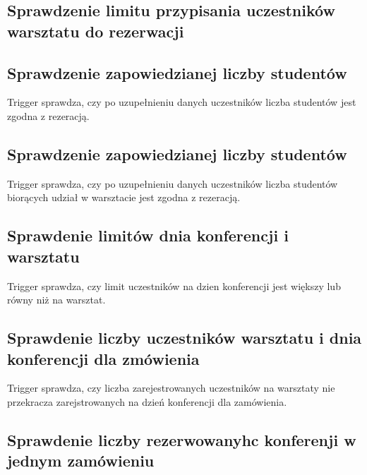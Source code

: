 \documentclass[12pt]{article}
\begin{document}


\subsection{Sprawdzenie limitu przypisania uczestników warsztatu do rezerwacji}



\subsection{Sprawdzenie zapowiedzianej liczby studentów}
Trigger sprawdza, czy po uzupełnieniu danych uczestników liczba studentów jest zgodna z rezeracją.


\subsection{Sprawdzenie zapowiedzianej liczby studentów}
Trigger sprawdza, czy po uzupełnieniu danych uczestników liczba studentów biorących udział w warsztacie jest zgodna z rezeracją.


\subsection{Sprawdenie limitów dnia konferencji i warsztatu }
Trigger sprawdza, czy limit uczestników na dzien konferencji jest większy lub równy niż na warsztat.


\subsection{Sprawdenie liczby uczestników warsztatu i dnia konferencji dla zmówienia}
Trigger sprawdza, czy liczba zarejestrowanych uczestników na warsztaty nie przekracza zarejstrowanych na dzień konferencji dla zamówienia.


\subsection{Sprawdenie liczby rezerwowanyhc konferenji w jednym zamówieniu}

\end{document}
